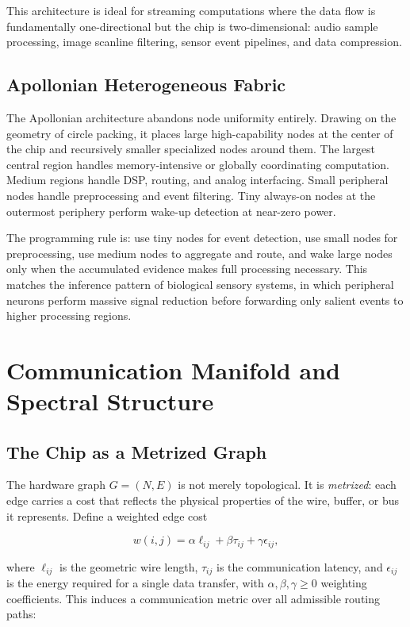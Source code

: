 \documentclass[11pt, a4paper]{article}
\begin{document}
This architecture is ideal for streaming computations where the data flow is
fundamentally one-directional but the chip is two-dimensional: audio sample
processing, image scanline filtering, sensor event pipelines, and data compression.

\subsection{Apollonian Heterogeneous Fabric}

The Apollonian architecture abandons node uniformity entirely. Drawing on the
geometry of circle packing, it places large high-capability nodes at the center of
the chip and recursively smaller specialized nodes around them. The largest central
region handles memory-intensive or globally coordinating computation. Medium regions
handle DSP, routing, and analog interfacing. Small peripheral nodes handle preprocessing
and event filtering. Tiny always-on nodes at the outermost periphery perform
wake-up detection at near-zero power.

The programming rule is: use tiny nodes for event detection, use small nodes for
preprocessing, use medium nodes to aggregate and route, and wake large nodes only
when the accumulated evidence makes full processing necessary. This matches the
inference pattern of biological sensory systems, in which peripheral neurons
perform massive signal reduction before forwarding only salient events to
higher processing regions.

\section{Communication Manifold and Spectral Structure}

\subsection{The Chip as a Metrized Graph}

The hardware graph $G = (N, E)$ is not merely topological. It is
\emph{metrized}: each edge carries a cost that reflects the physical properties of
the wire, buffer, or bus it represents. Define a weighted edge cost

\[
w(i,j) = \alpha \ell_{ij} + \beta \tau_{ij} + \gamma \epsilon_{ij},
\]

where $\ell_{ij}$ is the geometric wire length, $\tau_{ij}$ is the communication
latency, and $\epsilon_{ij}$ is the energy required for a single data transfer,
with $\alpha, \beta, \gamma \geq 0$ weighting coefficients. This induces a
communication metric over all admissible routing paths:
\end{document}
